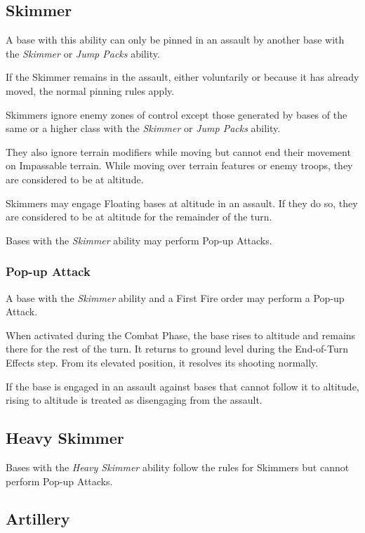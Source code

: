 \subsection{Skimmer}

A base with this ability can only be pinned in an assault by another base with the \textit{Skimmer} or \textit{Jump Packs} ability.

If the Skimmer remains in the assault, either voluntarily or because it has already moved, the normal pinning rules apply.

Skimmers ignore enemy zones of control except those generated by bases of the same or a higher class with the \textit{Skimmer} or \textit{Jump Packs} ability.

They also ignore terrain modifiers while moving but cannot end their movement on Impassable terrain. While moving over terrain features or enemy troops, they are considered to be at altitude.

Skimmers may engage Floating bases at altitude in an assault. If they do so, they are considered to be at altitude for the remainder of the turn.

Bases with the \textit{Skimmer} ability may perform Pop-up Attacks.

\subsubsection{Pop-up Attack}

A base with the \textit{Skimmer} ability and a First Fire order may perform a Pop-up Attack.

When activated during the Combat Phase, the base rises to altitude and remains there for the rest of the turn. It returns to ground level during the End-of-Turn Effects step. From its elevated position, it resolves its shooting normally.

If the base is engaged in an assault against bases that cannot follow it to altitude, rising to altitude is treated as disengaging from the assault.

\subsection{Heavy Skimmer}

Bases with the \textit{Heavy Skimmer} ability follow the rules for Skimmers but cannot perform Pop-up Attacks.

\subsection{Artillery}


